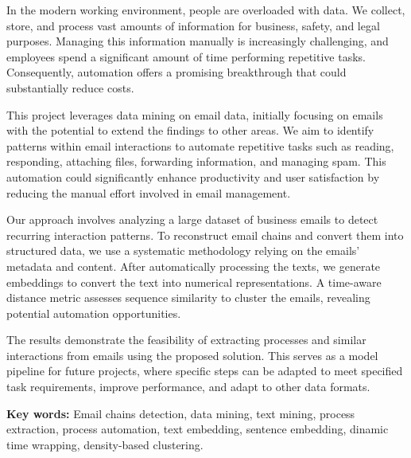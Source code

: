 
 In the modern working environment, people are overloaded with data. We collect, store, and process vast amounts of information for business, safety, and legal purposes. Managing this information manually is increasingly challenging, and employees spend a significant amount of time performing repetitive tasks. Consequently, automation offers a promising breakthrough that could substantially reduce costs.
 
 This project leverages data mining on email data, initially focusing on emails with the potential to extend the findings to other areas. We aim to identify patterns within email interactions to automate repetitive tasks such as reading, responding, attaching files, forwarding information, and managing spam. This automation could significantly enhance productivity and user satisfaction by reducing the manual effort involved in email management.

 Our approach involves analyzing a large dataset of business emails to detect recurring interaction patterns. To reconstruct email chains and convert them into structured data, we use a systematic methodology relying on the emails' metadata and content. After automatically processing the texts, we generate embeddings to convert the text into numerical representations. A time-aware distance metric assesses sequence similarity to cluster the emails, revealing potential automation opportunities.
 
 The results demonstrate the feasibility of extracting processes and similar interactions from emails using the proposed solution. This serves as a model pipeline for future projects, where specific steps can be adapted to meet specified task requirements, improve performance, and adapt to other data formats.

\vspace{1cm}
 
\textbf{Key words:} Email chains detection, data mining, text mining, process extraction, process automation, text embedding, sentence embedding, dinamic time wrapping, density-based clustering.